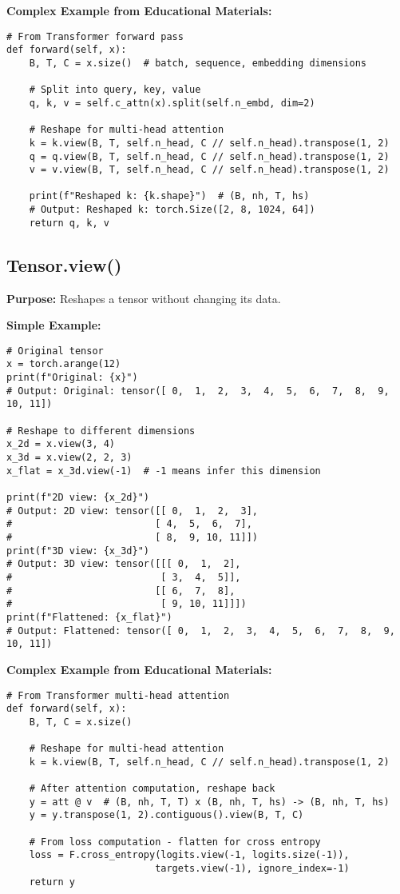 \documentclass[11pt,a4paper]{book}
\begin{document}
\textbf{Complex Example from Educational Materials:}
\begin{verbatim}
# From Transformer forward pass
def forward(self, x):
    B, T, C = x.size()  # batch, sequence, embedding dimensions
    
    # Split into query, key, value
    q, k, v = self.c_attn(x).split(self.n_embd, dim=2)
    
    # Reshape for multi-head attention
    k = k.view(B, T, self.n_head, C // self.n_head).transpose(1, 2)
    q = q.view(B, T, self.n_head, C // self.n_head).transpose(1, 2)
    v = v.view(B, T, self.n_head, C // self.n_head).transpose(1, 2)
    
    print(f"Reshaped k: {k.shape}")  # (B, nh, T, hs)
    # Output: Reshaped k: torch.Size([2, 8, 1024, 64])
    return q, k, v
\end{verbatim}

\subsection{Tensor.view()}

\textbf{Purpose:} Reshapes a tensor without changing its data.

\textbf{Simple Example:}
\begin{verbatim}
# Original tensor
x = torch.arange(12)
print(f"Original: {x}")
# Output: Original: tensor([ 0,  1,  2,  3,  4,  5,  6,  7,  8,  9, 10, 11])

# Reshape to different dimensions
x_2d = x.view(3, 4)
x_3d = x.view(2, 2, 3)
x_flat = x_3d.view(-1)  # -1 means infer this dimension

print(f"2D view: {x_2d}")
# Output: 2D view: tensor([[ 0,  1,  2,  3],
#                         [ 4,  5,  6,  7],
#                         [ 8,  9, 10, 11]])
print(f"3D view: {x_3d}")
# Output: 3D view: tensor([[[ 0,  1,  2],
#                          [ 3,  4,  5]],
#                         [[ 6,  7,  8],
#                          [ 9, 10, 11]]])
print(f"Flattened: {x_flat}")
# Output: Flattened: tensor([ 0,  1,  2,  3,  4,  5,  6,  7,  8,  9, 10, 11])
\end{verbatim}

\textbf{Complex Example from Educational Materials:}
\begin{verbatim}
# From Transformer multi-head attention
def forward(self, x):
    B, T, C = x.size()
    
    # Reshape for multi-head attention
    k = k.view(B, T, self.n_head, C // self.n_head).transpose(1, 2)
    
    # After attention computation, reshape back
    y = att @ v  # (B, nh, T, T) x (B, nh, T, hs) -> (B, nh, T, hs)
    y = y.transpose(1, 2).contiguous().view(B, T, C)
    
    # From loss computation - flatten for cross entropy
    loss = F.cross_entropy(logits.view(-1, logits.size(-1)), 
                          targets.view(-1), ignore_index=-1)
    return y
\end{verbatim}
\end{document}
